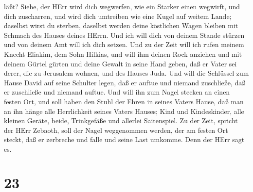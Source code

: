läßt?  Siehe, der HErr wird dich wegwerfen, wie ein Starker
einen wegwirft, und dich zuscharren,  und wird dich
umtreiben wie eine Kugel auf weitem Lande; daselbst wirst du sterben,
daselbst werden deine köstlichen Wagen bleiben mit Schmach des Hauses
deines HErrn.  Und ich will dich von deinem Stande stürzen
und von deinem Amt will ich dich setzen.  Und zu der Zeit
will ich rufen meinem Knecht Eliakim, dem Sohn Hilkias, 
und will ihm deinen Rock anziehen und mit deinem Gürtel gürten und deine
Gewalt in seine Hand geben, daß er Vater sei derer, die zu Jerusalem
wohnen, und des Hauses Juda.  Und will die Schlüssel zum
Hause David auf seine Schulter legen, daß er auftue und niemand
zuschließe, daß er zuschließe und niemand auftue.  Und will
ihn zum Nagel stecken an einen festen Ort, und soll haben den Stuhl der
Ehren in seines Vaters Hause,  daß man an ihn hänge alle
Herrlichkeit seines Vaters Hauses; Kind und Kindeskinder, alle kleinen
Geräte, beide, Trinkgefäße und allerlei Saitenspiel.  Zu
der Zeit, spricht der HErr Zebaoth, soll der Nagel weggenommen werden,
der am festen Ort steckt, daß er zerbreche und falle und seine Last
umkomme. Denn der HErr sagt es.

\hypertarget{section-22}{%
\section{23}\label{section-22}}


